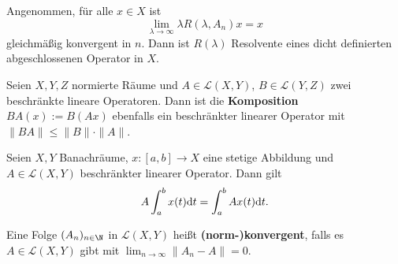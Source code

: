 



\begin{prop}
Angenommen, für alle $x\in X$ ist 
\begin{equation}
\lim_{\lambda\to\infty}\lambda R(\lambda, A_n)x=x
\end{equation}
gleichmäßig konvergent in $n$. Dann ist $R(\lambda)$ Resolvente eines dicht definierten abgeschlossenen Operator in $X$.
\end{prop}


\begin{prop}
  Seien $X,Y,Z$ normierte Räume und  $A\in\mathcal L(X,Y)$, $B\in\mathcal L(Y,Z)$ zwei beschränkte lineare Operatoren. Dann ist die \textbf{Komposition} $BA(x):=B(Ax)$ ebenfalls  ein beschränkter linearer Operator mit $\|BA\|\leq \|B\|\cdot\|A\|$.
\end{prop}

\begin{prop}
  Seien $X,Y$ Banachräume, $x\colon[a,b]\to X$ eine stetige Abbildung und $A\in\mathcal L (X,Y)$ beschränkter linearer Operator. Dann gilt $$A\int_a^b x(t)\text dt=\int_a^b Ax(t)\text dt.$$
\end{prop}

\begin{defi}[Normkonvergenz]
  Eine Folge $(A_n)_{n\in \N}$ in $\mathcal L(X,Y)$ heißt \textbf{(norm-)konvergent}, falls es $A\in\mathcal L(X,Y)$ gibt mit $\lim_{n\to\infty}\|A_n-A\|=0$.
\end{defi}

